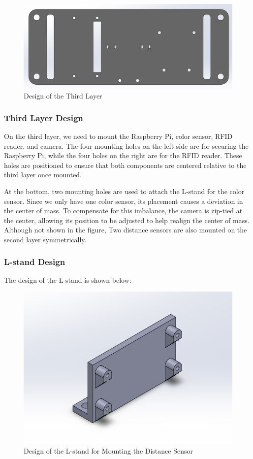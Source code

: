 \documentclass{article}
\begin{document}
\begin{figure}[H]
    \centerline{\includegraphics[width=\linewidth]{Figures/3rdlayer.png}}
    \caption{Design of the Third Layer}
\end{figure}

\subsubsection{Third Layer Design}
On the third layer, we need to mount the Raspberry Pi, color sensor, RFID
reader, and camera. The four mounting holes on the left side are for securing
the Raspberry Pi, while the four holes on the right are for the RFID reader.
These holes are positioned to ensure that both components are centered relative
to the third layer once mounted.

At the bottom, two mounting holes are used to attach the L-stand for the color
sensor. Since we only have one color sensor, its placement causes a deviation in
the center of mass. To compensate for this imbalance, the camera is zip-tied at
the center, allowing its position to be adjusted to help realign the center of
mass. Although not shown in the figure, Two distance sensors are also mounted on
the second layer symmetrically.

\subsubsection{L-stand Design}
The design of the L-stand is shown below:
\begin{figure}[H]
    \centerline{\includegraphics[width=0.5\linewidth]{Figures/standDis.png}}
    \caption{Design of the L-stand for Mounting the Distance Sensor}
\end{figure}
\end{document}
